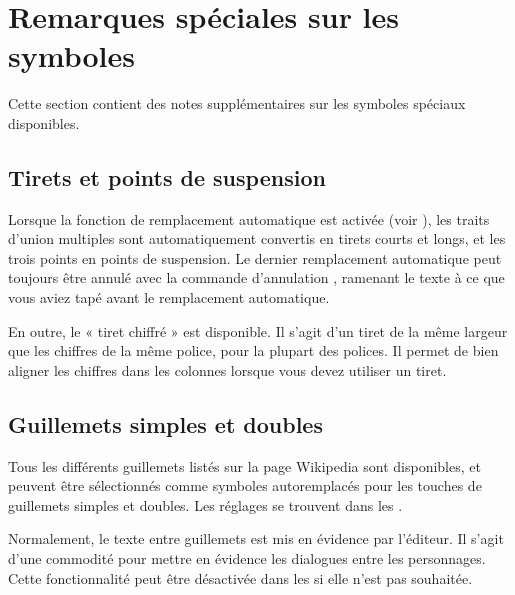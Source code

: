 \documentclass[a4paper,11pt,french]{sphinxmanual}
\begin{document}
\section{Remarques spéciales sur les symboles}
\label{\detokenize{usage_typography:special-notes-on-symbols}}\label{\detokenize{usage_typography:a-typ-notes}}
\sphinxAtStartPar
Cette section contient des notes supplémentaires sur les symboles spéciaux disponibles.


\subsection{Tirets et points de suspension}
\label{\detokenize{usage_typography:dashes-and-ellipsis}}
\sphinxAtStartPar
Lorsque la fonction de remplacement automatique est activée (voir {\hyperref[\detokenize{usage_writing:a-ui-edit-auto}]{}}), les traits d’union multiples sont automatiquement convertis en tirets courts et longs, et les trois points en points de suspension. Le dernier remplacement automatique peut toujours être annulé avec la commande d’annulation , ramenant le texte à ce que vous aviez tapé avant le remplacement automatique.

\sphinxAtStartPar
En outre, le « tiret chiffré » est disponible. Il s’agit d’un tiret de la même largeur que les chiffres de la même police, pour la plupart des polices. Il permet de bien aligner les chiffres dans les colonnes lorsque vous devez utiliser un tiret.


\subsection{Guillemets simples et doubles}
\label{\detokenize{usage_typography:single-and-double-quotes}}
\sphinxAtStartPar
Tous les différents guillemets listés sur la page Wikipedia  sont disponibles, et peuvent être sélectionnés comme symboles auto\sphinxhyphen{}remplacés pour les touches de guillemets simples et doubles. Les réglages se trouvent dans les .

\sphinxAtStartPar
Normalement, le texte entre guillemets est mis en évidence par l’éditeur. Il s’agit d’une commodité pour mettre en évidence les dialogues entre les personnages. Cette fonctionnalité peut être désactivée dans les  si elle n’est pas souhaitée.
\end{document}
